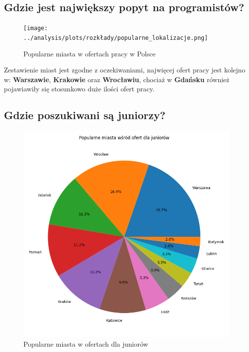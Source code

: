 \documentclass[a4paper]{article}
\begin{document}
\subsection{Gdzie jest największy popyt na programistów?}

\begin{figure}[H]
    \centering
    \texttt{[image: ../analysis/plots/rozkłady/popularne\_lokalizacje.png]}
    \caption{Popularne miasta w ofertach pracy w Polsce}
\end{figure}

\quad Zestawienie miast jest zgodne z oczekiwaniami, najwięcej ofert pracy jest kolejno w: \textbf{Warszawie}, \textbf{Krakowie} oraz \textbf{Wrocławiu}, chociaż w
\textbf{Gdańsku} również pojawiawiły się stosunkowo duże ilości ofert pracy.


\subsection{Gdzie poszukiwani są juniorzy?}

\begin{figure}[H]
    \centering
    \includegraphics[width=\textwidth]{../analysis/plots/rozkłady/popularne_miasta_wśród_ofert_dla_juniorów.png}
    \caption{Popularne miasta w ofertach dla juniorów}
\end{figure}
\end{document}
